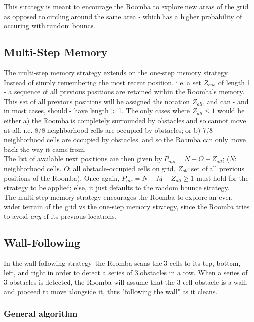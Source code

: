 \documentclass[11pt]{article}
\begin{document}
This strategy is meant to encourage the Roomba to explore new areas of
the grid as opposed to circling around the same area - which has a
higher probability of occuring with random bounce.

\subsection{Multi-Step Memory}

The multi-step memory strategy extends on the one-step memory strategy.
Instead of simply remembering the most recent position, i.e. a set
\(Z_{one}\) of length 1 - a sequence of all previous positions are
retained within the Roomba's memory. This set of all previous positions
will be assigned the notation \(Z_{all}\), and can - and in most cases,
should - have length \textgreater{} 1. The only cases where
\(Z_{all} \leq 1\) would be either a) the Roomba is completely
surrounded by obstacles and so cannot move at all, i.e. 8/8 neighborhood
cells are occupied by obstacles; or b) 7/8 neighborhood cells are
occupied by obstacles, and so the Roomba can only move back the way it
came from.\\

The list of available next positions are then given by  \(P_{ms} = N - O - Z_{all}\);
 (\(N\): neighborhood cells, \(O\): all obstacle-occupied
cells on grid, \(Z_{all}:\)set of all previous positions of the
Roomba\()\). Once again, \(P_{ms} = N - M - Z_{all}\geq 1\) must hold
for the strategy to be applied; else, it just defaults to the random
bounce strategy.\\

The multi-step memory strategy encourages the Roomba to explore an even
wider terrain of the grid vs the one-step memory strategy, since the
Roomba tries to avoid \emph{any} of its previous locations.

\subsection{Wall-Following}

In the wall-following strategy, the Roomba scans the 3 cells to its top,
bottom, left, and right in order to detect a series of 3 obstacles in a
row. When a series of 3 obstacles is detected, the Roomba will assume
that the 3-cell obstacle is a wall, and proceed to move alongside it,
thus "following the wall" as it cleans.

\subsubsection{General algorithm}
\end{document}
